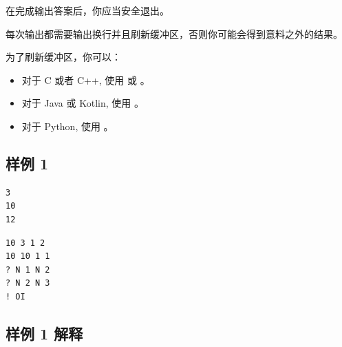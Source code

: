 在完成输出答案后，你应当安全退出。

每次输出都需要输出换行并且刷新缓冲区，否则你可能会得到意料之外的结果。

为了刷新缓冲区，你可以：

\begin{itemize}
   \item 对于 C 或者 C++, 使用  或 。
   \item 对于 Java 或 Kotlin, 使用 。
   \item 对于 Python, 使用 。
\end{itemize}

\subsection{样例 1}

\begin{minipage}{\linewidth}
	\begin{minipage}[t]{0.49\linewidth}
		\begin{lstlisting}[title=\texttt{standard input}]
3
10
12
\end{lstlisting}
	\end{minipage}
	\begin{minipage}[t]{0.49\linewidth}
		\begin{lstlisting}[title=\texttt{standard output}]
10 3 1 2
10 10 1 1
? N 1 N 2
? N 2 N 3
! OI
\end{lstlisting}
	\end{minipage}
\end{minipage}


\subsection{样例 1 解释}

